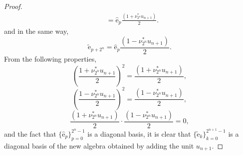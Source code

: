 \documentclass[10pt,a4paper]{amsart}
\begin{document}
\begin{proof}
$$\begin{aligned}
        &= \hat{\mathrm e}_p \frac{(1 + \nu^*_{2^n} u_{n+1})}{2}.
    \end{aligned} $$
    and in the same way,
    $$ \tilde{\mathrm e}_{p + 2^n} = \hat{\mathrm e}_p \frac{(1 - \nu^*_{2^n} u_{n+1})}{2}. $$
        From the following properties,
        $$ \left( \frac{1 + \nu^*_{2^n} u_{n+1}}{2} \right)^2 = \frac{(1 + \nu^*_{2^n} u_{n+1})}{2}, $$
        $$ \left( \frac{1 - \nu^*_{2^n} u_{n+1}}{2} \right)^2 = \frac{(1 - \nu^*_{2^n} u_{n+1})}{2}, $$
        $$ \frac{(1 + \nu^*_{2^n} u_{n+1})}{2} \cdot \frac{(1 - \nu^*_{2^n} u_{n+1})}{2} = 0, $$
        and the fact that $\{ \hat{\mathrm e}_p \}_{p=0}^{2^n-1}$ is a diagonal basis, it is clear that $\{ \tilde{\mathrm e}_k \}_{k=0}^{2^{n+1}-1}$ is a diagonal basis of the new algebra obtained by adding the unit $u_{n+1}$.
\end{proof}
\end{document}
